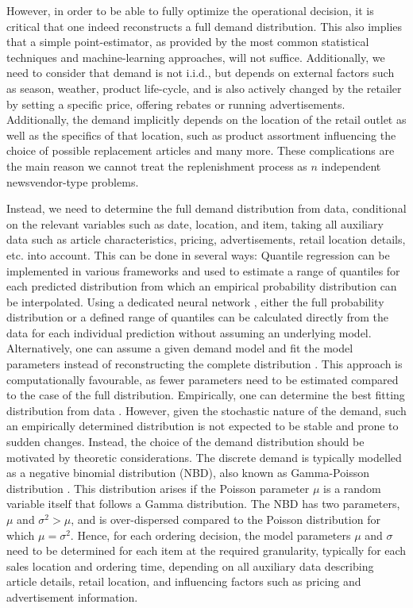 \documentclass[BCOR=1mm, DIV=calc,10pt,
twoside=true,
twocolumn,
headings=normal]{scrartcl}
\begin{document}
However, in order to be able to fully optimize the operational decision, it is critical that one indeed reconstructs a full demand distribution. This also implies that a simple point-estimator, as provided by the most common statistical techniques and machine-learning approaches, will not suffice. Additionally, we need to consider that demand is not i.i.d., but depends on external factors such as season, weather, product life-cycle, and is also actively changed by the retailer by setting a specific price, offering rebates or running advertisements. Additionally, the demand implicitly depends on the location of the retail outlet as well as the specifics of that location, such as product  assortment influencing the choice of possible replacement articles and many more. These complications are the main reason we cannot treat the replenishment process as $n$ independent newsvendor-type problems.

Instead, we need to determine the full demand distribution from data, conditional on the relevant variables such as date, location, and item, taking all auxiliary data such as article characteristics, pricing, advertisements, retail location details, etc. into account. This can be done in several ways: Quantile regression \cite{koenker2001, wen2017} can be implemented in various frameworks and used to estimate a range of quantiles for each predicted distribution from which an empirical probability distribution can be interpolated. Using a dedicated neural network \cite{Feindt2006190}, either the  full probability distribution or a defined range of quantiles can be calculated directly from the data for each individual prediction without assuming an underlying model. Alternatively, one can assume a given demand model and fit the model parameters instead of reconstructing the complete distribution \cite{astonpr373, SALINAS20201181}. This approach is computationally favourable, as fewer parameters need to be estimated compared to the case of the full distribution. Empirically, one can determine the best fitting distribution from data \cite{adan1995}. However, given the stochastic nature of the demand, such an empirically determined distribution is not expected to be stable and prone to sudden changes. Instead, the choice of the demand distribution should be motivated by theoretic considerations. The discrete demand is typically modelled as a negative binomial distribution (NBD), also known as Gamma-Poisson distribution \cite{Ehrenberg1959,Ehrenberg1967,Ehrenberg1972,Chatfield1973,Schmittlein_1985}. This distribution arises if the Poisson parameter $\mu$ is a random variable itself that follows a Gamma distribution. The NBD has two parameters, $\mu$ and $ \sigma^2 > \mu$, and is over-dispersed compared to the Poisson distribution for which $\mu = \sigma^2$. Hence, for each ordering decision, the model parameters $\mu$ and $\sigma$ need to be determined for each item at the required granularity, typically for each sales location and ordering time, depending on all auxiliary data describing article details, retail location, and influencing factors such as pricing and advertisement information.
\end{document}
